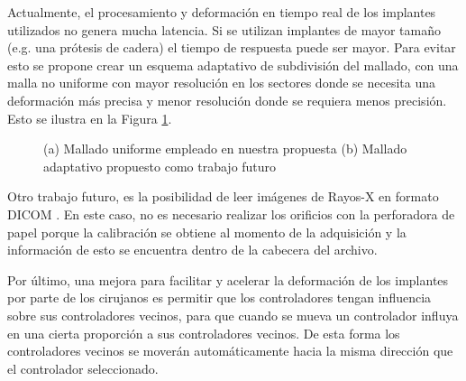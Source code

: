 Actualmente, el procesamiento y deformaci\'on en tiempo real de los implantes utilizados no genera mucha latencia. Si se utilizan implantes de mayor tama\~no (e.g. una pr\'otesis de cadera) el tiempo de respuesta puede ser mayor. Para evitar esto se propone crear un esquema adaptativo de subdivisi\'on del mallado, con una malla no uniforme con mayor resoluci\'on en los sectores donde se necesita una deformaci\'on m\'as precisa y menor resoluci\'on donde se requiera menos precisi\'on. Esto se ilustra en la Figura \ref{fig:distMul}.
\begin{figure}[htbp]
  \begin{center} 
   \hspace{1.0cm}  
  \end{center}
  \caption{(a) Mallado uniforme empleado en nuestra propuesta (b) Mallado adaptativo propuesto como trabajo futuro}
  \label{fig:distMul}
\end{figure}

Otro trabajo futuro, es la posibilidad de leer im\'agenes de Rayos-X en formato DICOM \cite{REF_DICOM}. En este caso, no es necesario realizar los orificios con la perforadora de papel porque la calibraci\'on se obtiene al momento de la adquisici\'on y la informaci\'on de esto se encuentra dentro de la cabecera del archivo.

Por \'ultimo, una mejora para facilitar y acelerar la deformaci\'on de los implantes por parte de los cirujanos es permitir que los controladores tengan influencia sobre sus controladores vecinos, para que cuando se mueva un controlador influya en una cierta proporci\'on a sus controladores vecinos. De esta forma los controladores vecinos se mover\'an autom\'aticamente hacia la misma direcci\'on que el controlador seleccionado.